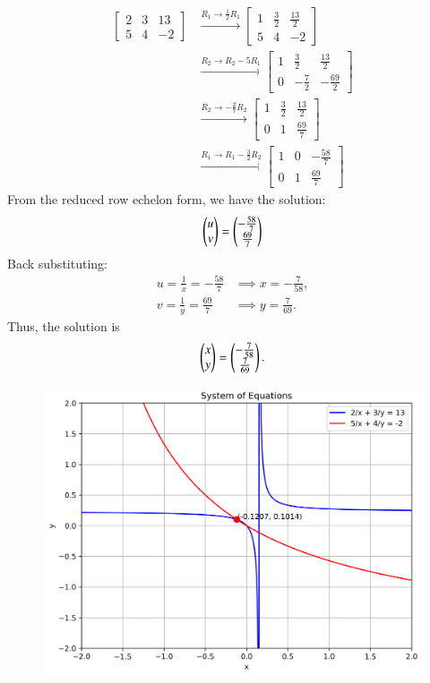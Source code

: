 \documentclass[journal]{IEEEtran}
\begin{document}
	\begin{align}
		\left[\begin{array}{cc|c}
			2 & 3 & 13 \\
			5 & 4 & -2
		\end{array}\right]
		&\xrightarrow{R_1 \rightarrow \frac{1}{2}R_1}
		\left[\begin{array}{cc|c}
			1 & \frac{3}{2} & \frac{13}{2} \\
			5 & 4 & -2
		\end{array}\right] \\
		&\xrightarrow{R_2 \rightarrow R_2 - 5R_1}
		\left[\begin{array}{cc|c}
			1 & \frac{3}{2} & \frac{13}{2} \\
			0 & -\frac{7}{2} & -\frac{69}{2}
		\end{array}\right] \\
		&\xrightarrow{R_2 \rightarrow -\frac{2}{7}R_2}
		\left[\begin{array}{cc|c}
			1 & \frac{3}{2} & \frac{13}{2} \\
			0 & 1 & \frac{69}{7}
		\end{array}\right] \\
		&\xrightarrow{R_1 \rightarrow R_1 - \frac{3}{2}R_2}
		\left[\begin{array}{cc|c}
			1 & 0 & -\frac{58}{7} \\
			0 & 1 & \frac{69}{7}
		\end{array}\right]
	\end{align}
	From the reduced row echelon form, we have the solution:
	\begin{align}
		\begin{pmatrix}u \\ v\end{pmatrix} = \begin{pmatrix}-\frac{58}{7} \\ \frac{69}{7}\end{pmatrix}
	\end{align}
	Back substituting:
	\begin{align}
		u = \frac{1}{x} = -\frac{58}{7} &\implies x = -\frac{7}{58}, \\
		v = \frac{1}{y} = \frac{69}{7} &\implies y = \frac{7}{69}.
	\end{align}
	Thus, the solution is
	\begin{align}
		\begin{pmatrix}x \\ y\end{pmatrix} = \begin{pmatrix}-\tfrac{7}{58} \\ \tfrac{7}{69}\end{pmatrix}.
	\end{align}
	\begin{figure}[H]
		\centering
		\includegraphics[width=1\linewidth]{figs/equation_plot}
	\end{figure}
	
\end{document}
